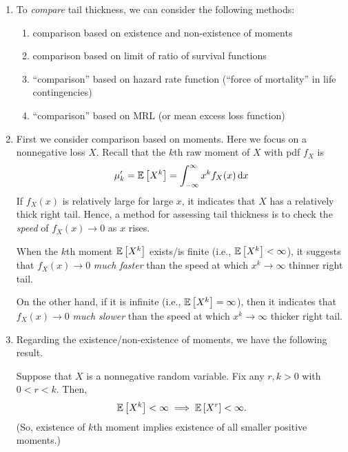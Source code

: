 \begin{enumerate}
\begin{note}
\end{note}
\item To \emph{compare} tail thickness, we can consider the following methods:
\begin{enumerate}
\item comparison based on existence and non-existence of moments
\item comparison based on limit of ratio of survival functions
\item ``comparison'' based on hazard rate function (``force of mortality'' in life contingencies)
\item ``comparison'' based on MRL (or mean excess loss function)
\end{enumerate}
\item First we consider comparison based on moments. Here we focus on a
nonnegative loss \(X\). Recall that the \(k\)th raw moment of \(X\) with pdf
\(f_X\) is
\[
\mu_k'=\mathbb{E}\left[X^k\right]=\int_{-\infty}^{\infty}x^kf_X(x)\dd{x}
\]
If \(f_X(x)\) is relatively large for large \(x\), it indicates that \(X\) has
a relatively thick right tail. Hence, a method for assessing tail thickness is
to check the \emph{speed} of \(f_X(x)\to 0\) as \(x\) rises.

When the \(k\)th moment \(\mathbb{E}\left[X^k\right]\) exists/is finite (i.e.,
\(\mathbb{E}\left[X^k\right]<\infty\)), it suggests that \(f_X(x)\to 0\) \emph{much faster} than the
speed at which \(x^k\to\infty\)  thinner right tail.

On the other hand, if it is infinite (i.e., \(\mathbb{E}\left[X^k\right]=\infty\)), then it
indicates that \(f_X(x)\to 0\) \emph{much slower} than the speed at which
\(x^k\to\infty\)  thicker right tail.

\item Regarding the existence/non-existence of moments, we have the following
result.
\begin{proposition}
\label{prp:high-low-moment-relation}
Suppose that \(X\) is a nonnegative random variable. Fix any \(r,k>0\) with
\(0<r<k\). Then,
\[
\mathbb{E}\left[X^k\right]<\infty\implies \mathbb{E}\left[X^r\right]<\infty.
\]
(So, existence of \(k\)th moment implies existence of
all smaller positive moments.)


\end{proposition}
\end{enumerate}
